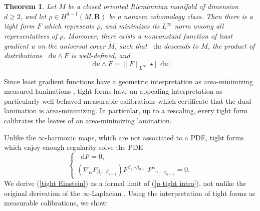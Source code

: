 \documentclass[reqno,11pt]{amsart}
\newcommand{\RR}{\mathbf{R}}
\newcommand*\dif{\mathop{}\!\mathrm{d}}
\newtheorem{theorem}{Theorem}[section]
\theoremstyle{definition}
\numberwithin{equation}{section}
\begin{document}
\begin{theorem}\label{existence of infinity tight forms}
Let $M$ be a closed oriented Riemannian manifold of dimension $d \geq 2$, and let $\rho \in H^{d - 1}(M, \RR)$ be a nonzero cohomology class.
Then there is a tight form $F$ which represents $\rho$, and minimizes its $L^\infty$ norm among all representatives of $\rho$.
Moreover, there exists a nonconstant function of least gradient $u$ on the universal cover $\tilde M$, such that $\dif u$ descends to $M$, the product of distributions $\dif u \wedge F$ is well-defined, and
\begin{equation}\label{max flow min cut}
\dif u \wedge F = \|F\|_{L^\infty} \star |\dif u|.
\end{equation}
\end{theorem}

Since least gradient functions have a geometric interpretation as area-minimizing measured laminations \cite{BackusCML}, tight forms have an appealing interpretation as particularly well-behaved measurable calibrations which certificate that the dual lamination is area-minimizing.
In particular, up to a rescaling, every tight form calibrates the leaves of an area-minimizing lamination.




Unlike the $\infty$-harmonic maps, which are not associated to a PDE, tight forms which enjoy enough regularity solve the PDE
\begin{equation}\label{tight Einstein}
\begin{cases}\dif F = 0, \\
	(\nabla_\alpha F_{\beta_1 \cdots \beta_{d - 1}}) F^{\beta_1 \cdots \beta_{d - 1}} {F^\alpha}_{\gamma_1 \cdots \gamma_{d - 2}} = 0.
\end{cases}
\end{equation}
We derive (\ref{tight Einstein}) as a formal limit of (\ref{p tight intro}), not unlike the original derivation of the $\infty$-Laplacian \cite{Aronsson67}.
Using the interpretation of tight forms as measurable calibrations, we show:
\end{document}
